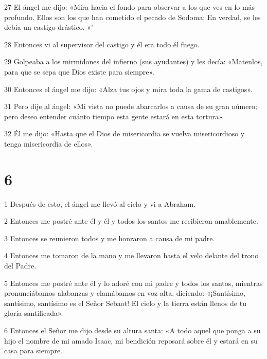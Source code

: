 \par 27 El ángel me dijo: «Mira hacia el fondo para observar a los que ves en lo más profundo. Ellos son los que han cometido el pecado de Sodoma; En verdad, se les debía un castigo drástico. »'

\par 28 Entonces vi al supervisor del castigo y él era todo él fuego.

\par 29 Golpeaba a los mirmidones del infierno (sus ayudantes) y les decía: «Matenlos, para que se sepa que Dios existe para siempre».

\par 30 Entonces el ángel me dijo: «Alza tus ojos y mira toda la gama de castigos».

\par 31 Pero dije al ángel: «Mi vista no puede abarcarlos a causa de su gran número; pero deseo entender cuánto tiempo esta gente estará en esta tortura».

\par 32 Él me dijo: «Hasta que el Dios de misericordia se vuelva misericordioso y tenga misericordia de ellos».

\chapter{6}

\par 1 Después de esto, el ángel me llevó al cielo y vi a Abraham.

\par 2 Entonces me postré ante él y él y todos los santos me recibieron amablemente.

\par 3 Entonces se reunieron todos y me honraron a causa de mi padre.

\par 4 Entonces me tomaron de la mano y me llevaron hasta el velo delante del trono del Padre.

\par 5 Entonces me postré ante él y lo adoré con mi padre y todos los santos, mientras pronunciábamos alabanzas y clamábamos en voz alta, diciendo: «¡Santísimo, santísimo, santísimo es el Señor Sebaot! El cielo y la tierra están llenos de tu gloria santificada».

\par 6 Entonces el Señor me dijo desde su altura santa: «A todo aquel que ponga a su hijo el nombre de mi amado Isaac, mi bendición reposará sobre él y estará en su casa para siempre.

